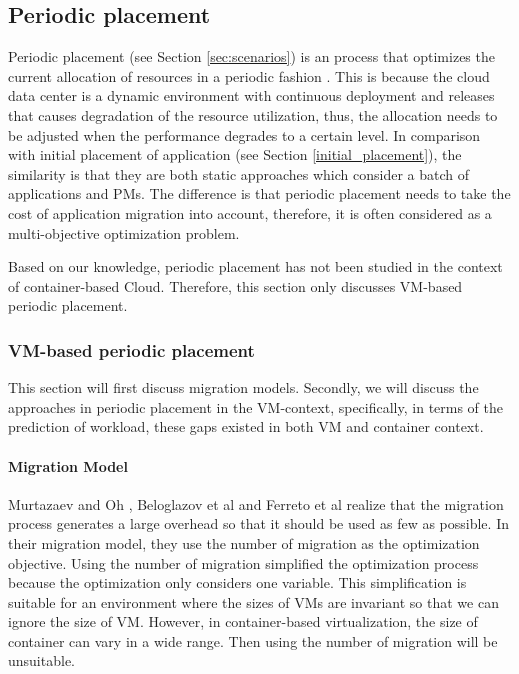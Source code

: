 \subsection{Periodic placement}
Periodic placement (see Section \ref{sec:scenarios}) is an process that optimizes the current allocation of resources in a periodic fashion \cite{Mishra:2012kx}. This is because the cloud data center is a dynamic environment with continuous deployment and releases that causes degradation of the resource utilization, thus, the allocation needs to be adjusted when the performance degrades to a certain level. In comparison with initial placement of application (see Section \ref{initial_placement}), the similarity is that they are both static approaches which consider a batch of applications and PMs. The difference is that periodic placement needs to take the cost of application migration into account, therefore, it is often considered as a multi-objective optimization problem. 

Based on our knowledge, periodic placement has not been studied in the context of container-based Cloud. 
Therefore, this section only discusses VM-based periodic placement.

\subsubsection{VM-based periodic placement}
This section will first discuss migration models. Secondly, we will discuss the approaches in periodic placement in the VM-context, specifically, in terms of the prediction of workload, these gaps existed in both VM and container context. 

\paragraph{Migration Model}
Murtazaev and Oh \cite{Murtazaev:2014eo}, Beloglazov et al \cite{Beloglazov:2012ji} and Ferreto et al \cite{Ferreto:2011iia} realize that the migration process generates a large overhead so that it should be used as few as possible. In their migration model, they use the number of migration as the optimization objective. Using the number of migration simplified the optimization process because the optimization only considers one variable. This simplification is suitable for an environment where the sizes of VMs are invariant so that we can ignore the size of VM. However, in container-based virtualization, the size of container can vary in a wide range. Then using the number of migration will be unsuitable.

